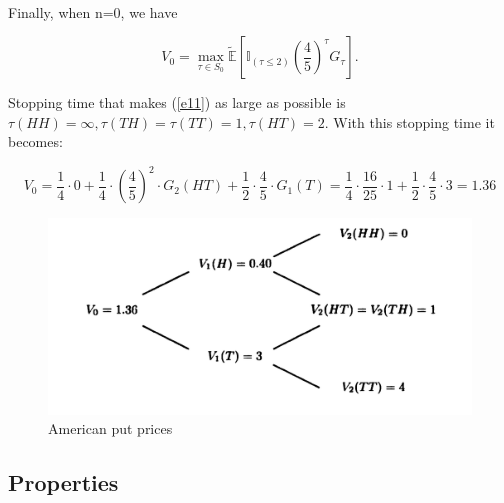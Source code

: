 \documentclass[c, dvipsnames, 8pt]{beamer}
\begin{document}
\begin{frame}[shrink=5]

\frametitle{\insertsection} 
\framesubtitle{\insertsubsection} 

\

Finally, when n=0, we have


\begin{equation}\label{e11}
V_0 = \max\limits_{{\tau \in S_0}}\widetilde{\mathbb{E}}\left [ \mathbb{I}_{(\tau\leq 2)} \left ( \frac{4}{5} \right )^{\tau}G_\tau  \right ].
\end{equation}

Stopping time that makes (\ref{e11}) as large as possible is $\tau(HH)= \infty, \tau(TH)= \tau(TT)= 1, \tau(HT)= 2 $. With this stopping time it becomes:

\begin{equation}\label{key}
V_0 = \frac{1}{4}\cdot 0 + \frac{1}{4}\cdot \left (\frac{4}{5}  \right )^{2}\cdot G_2(HT)+\frac{1}{2}\cdot \frac{4}{5}\cdot G_1(T) = \frac{1}{4}\cdot \frac{16}{25}\cdot 1 + \frac{1}{2}\cdot \frac{4}{5}\cdot 3 = 1.36
\end{equation}


\begin{figure}
	\centering
	\includegraphics[width=0.7\linewidth]{screenshot007}
	\caption{American put prices}
	\label{fig:screenshot007}
\end{figure}


\end{frame}

\subsection{Properties}
\end{document}
